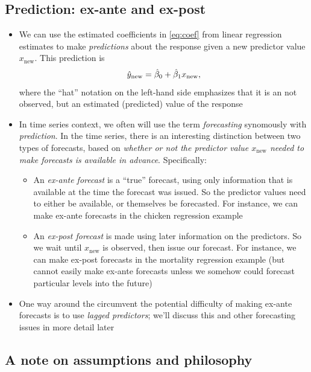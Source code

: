 \documentclass{article}
\begin{document}
\subsection{Prediction: ex-ante and ex-post}

\begin{itemize}
\item We can use the estimated coefficients   in
  \eqref{eq:coef} from linear regression estimates to make \emph{predictions}
  about the response given a new predictor value $x_{\text{new}}$. This
  prediction is  
  \[
  \hat{y}_{\text{new}} = \hat{\beta}_0 + \hat{\beta}_1 x_{\text{new}},
  \]
  where the ``hat'' notation on the left-hand side emphasizes that it is an not  
  observed, but an estimated (predicted) value of the response

\item In time series context, we often will use the term \emph{forecasting}
  synomously with \emph{prediction}. In the time series, there is an interesting
  distinction between two types of forecasts, based on \emph{whether or not the
    predictor value $x_{\text{new}}$ needed to make forecasts is available in
    advance}. Specifically:   
  \begin{itemize}
  \item An \emph{ex-ante forecast} is a ``true'' forecast, using only
    information that is available at the time the forecast was issued. So the
    predictor values need to either be available, or themselves be
    forecasted. For instance, we can make ex-ante forecasts in the chicken 
    regression example

  \item An \emph{ex-post forecast} is made using later information on the
    predictors. So we wait until $x_{\text{new}}$ is observed, then issue our
    forecast. For instance, we can make ex-post forecasts in the mortality
    regression example (but cannot easily make ex-ante forecasts unless we 
    somehow could forecast particular levels into the future)
  \end{itemize}

\item One way around the circumvent the potential difficulty of making ex-ante
  forecasts is to use \emph{lagged predictors}; we'll discuss this and other
  forecasting issues in more detail later
\end{itemize}

\subsection{A note on assumptions and philosophy}
\end{document}
